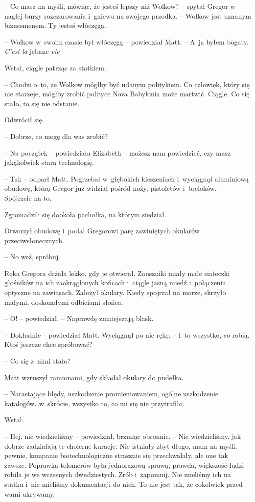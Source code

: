 \documentclass[oneside,polish,12pt,sfheadings]{mwbk}
\begin{document}
-- Co masz na myśli, mówiąc, że jesteś lepszy niż Wolkow? -- spytał Gregor
w nagłej burzy rozczarowania i~gniewu na swojego przodka. -- Wolkow jest
uznanym biznesmenem. Ty jesteś włóczęgą.

-- Wolkow w~swoim czasie był włóczęgą -- powiedział Matt. -- A~ja byłem
bogaty. \emph{C'est la} jebane \emph{vie}

Wstał, ciągle patrząc za statkiem. 

-- Chodzi o~to, że Wolkow mógłby być
udanym politykiem. Co człowiek, który się nie starzeje, mógłby zrobić
polityce Nova Babylonia może martwić. Ciągle. Co się stało, to się nie
odstanie.

Odwrócił się. 

-- Dobrze, co mogę dla was zrobić?

-- Na początek -- powiedziała Elizabeth -- możesz nam powiedzieć, czy masz
jakąkolwiek starą technologię.

-- Tak -- odparł Matt. Pogrzebał w~głębokich kieszeniach i~wyciągnął
aluminiową obudowę, którą Gregor już widział pośród noży, pistoletów i~breloków. -- Spójrzcie na to.

Zgromadzili się dookoła pachołka, na którym siedział.

Otworzył obudowę i~podał Gregorowi parę zawiniętych okularów
przeciwsłonecznych.

-- No weź, spróbuj.

Ręka Gregora drżała lekko, gdy je otwierał. Zauszniki miały małe
siateczki głośników na ich zaokrąglonych końcach i~ciągle jasną miedź i~połączenia optyczne na zawiasach. Założył okulary. Kiedy spojrzał na
morze, skrzyło małymi, doskonałymi odbiciami słońca.

-- O! -- powiedział. -- Naprawdę zmniejszają blask.

-- Dokładnie -- powiedział Matt. Wyciągnął po nie rękę. -- I~to wszystko,
co robią. Ktoś jeszcze chce spróbować?

-- Co się z~nimi stało?

Matt wzruszył ramionami, gdy składał okulary do pudełka.

-- Narastające błędy, uszkodzenie promieniowaniem, ogólne uszkodzenie
katalogów\ldots w~skrócie, wszystko to, co mi się nie przytrafiło.

Wstał. 

-- Hej, nie wiedzieliśmy -- powiedział, brzmiąc obronnie. -- Nie
wiedzieliśmy, jak dobrze zadziałają te cholerne kuracje. Nie istniały
zbyt długo, mam na myśli, pewnie, kompanie biotechnologiczne strasznie
się przechwalały, ale one tak zawsze. Poprawka telomerów była
jednorazową sprawą, prawda, większość ludzi robiła je we wczesnych
dwudziestych. Zrób i~zapomnij. Nie mieliśmy ich na statku i~nie mieliśmy
dokumentacji do nich. To nie jest tak, że cokolwiek przed wami ukrywamy.
\end{document}

